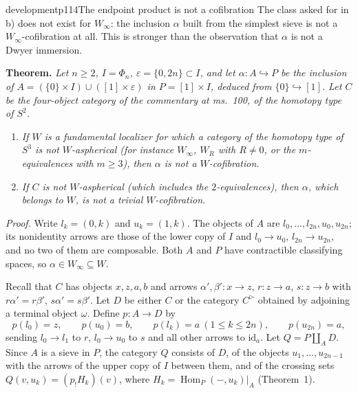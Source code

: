 \begin{dcomment}{development}{p114}{The endpoint product is not a cofibration}
The class asked for in b) does not exist for $W_\infty$: the inclusion $\alpha$ built from the simplest sieve is not a $W_\infty$-cofibration at all. This is stronger than the observation that $\alpha$ is not a Dwyer immersion.

\textbf{Theorem.}\ours
\textit{Let $n\geq2$, $I=\Phi_n$, $\varepsilon=\{0,2n\}\subset I$, and let $\alpha:A\hookrightarrow P$ be the inclusion of $A=(\{0\}\times I)\cup([1]\times\varepsilon)$ in $P=[1]\times I$, deduced from $\{0\}\hookrightarrow[1]$. Let $C$ be the four-object category of the commentary at ms.~100, of the homotopy type of $S^2$.}
\begin{enumerate}[label=(\alph*)]
\item \textit{If $W$ is a fundamental localizer for which a category of the homotopy type of $S^3$ is not $W$-aspherical (for instance $W_\infty$, $W_R$ with $R\neq0$, or the $m$-equivalences with $m\geq3$), then $\alpha$ is not a $W$-cofibration.}
\item \textit{If $C$ is not $W$-aspherical (which includes the $2$-equivalences), then $\alpha$, which belongs to $W$, is not a trivial $W$-cofibration.}
\end{enumerate}

\textit{Proof.}
Write $l_k=(0,k)$ and $u_k=(1,k)$. The objects of $A$ are $l_0,\dots,l_{2n},u_0,u_{2n}$; its nonidentity arrows are those of the lower copy of $I$ and $l_0\to u_0$, $l_{2n}\to u_{2n}$, and no two of them are composable. Both $A$ and $P$ have contractible classifying spaces, so $\alpha\in W_\infty\subseteq W$.

Recall that $C$ has objects $x,z,a,b$ and arrows $\alpha',\beta':x\to z$, $r:z\to a$, $s:z\to b$ with $r\alpha'=r\beta'$, $s\alpha'=s\beta'$. Let $D$ be either $C$ or the category $C^{\triangleright}$ obtained by adjoining a terminal object $\omega$. Define $p:A\to D$ by
\[
 p(l_0)=z,\qquad p(u_0)=b,\qquad p(l_k)=a\ (1\leq k\leq2n),\qquad p(u_{2n})=a,
\]
sending $l_0\to l_1$ to $r$, $l_0\to u_0$ to $s$ and all other arrows to $\mathrm{id}_a$. Let $Q=P\amalg_AD$. Since $A$ is a sieve in $P$, the category $Q$ consists of $D$, of the objects $u_1,\dots,u_{2n-1}$ with the arrows of the upper copy of $I$ between them, and of the crossing sets $Q(v,u_k)=(p_!H_k)(v)$, where $H_k=\operatorname{Hom}_P(-,u_k)|_A$ (Theorem~1).


\end{dcomment}
